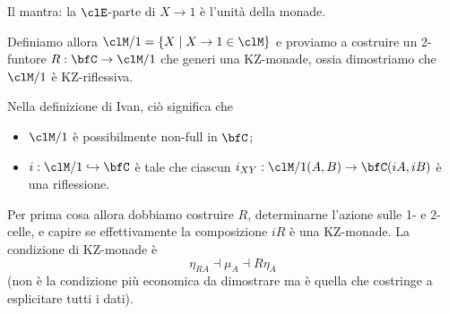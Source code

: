 \documentclass{amsart}
\begin{document}
Il mantra: la $\clE$-parte di $X \to 1$ è l'unità della monade.

Definiamo allora $\clM/1 = \{X\mid X\to 1\in\clM\}$ e proviamo a costruire un 2-funtore $R : \bfC \to \clM/1$ che generi una KZ-monade, ossia dimostriamo che $\clM/1$ è KZ-riflessiva.

Nella definizione di Ivan, ciò significa che 
\begin{itemize}
  \item $\clM/1$ è possibilmente non-full in $\bfC$;
  \item $i : \clM/1 \hookrightarrow \bfC$ è tale che ciascun $i_{XY} : \clM/1(A,B) \to \bfC(iA,iB)$ è una riflessione. 
\end{itemize}
Per prima cosa allora dobbiamo costruire $R$, determinarne l'azione sulle 1- e  2-celle, e capire se effettivamente la composizione $iR$ è una KZ-monade. La condizione di KZ-monade è
\[\eta_{RA}\dashv \mu_A \dashv R\eta_A\]
(non è la condizione più economica da dimostrare ma è quella che costringe a esplicitare tutti i dati).
\end{document}
